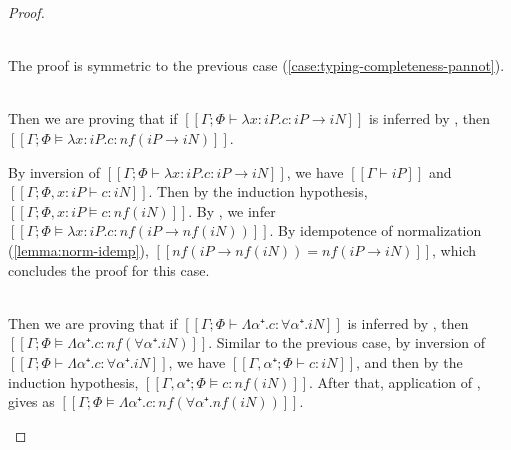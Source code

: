 \begin{proof}
\begin{caseof}
        \item {}\\
            The proof is symmetric to the previous case 
            (\cref{case:typing-completeness-pannot}).

        \item {}\\
            Then we are proving that if
            $[[Γ ; Φ ⊢ λx:iP . c : iP → iN]]$ is inferred by ,
            then $[[Γ ; Φ ⊨ λx:iP . c : nf(iP → iN)]]$.

            By inversion of $[[Γ ; Φ ⊢ λx:iP . c : iP → iN]]$, we have
            $[[Γ ⊢ iP]]$ and $[[Γ; Φ, x:iP ⊢ c : iN]]$.
            Then by the induction hypothesis, $[[Γ; Φ, x:iP ⊨ c : nf(iN)]]$.
            By , we infer
            $[[Γ; Φ ⊨ λx:iP . c : nf(iP → nf(iN))]]$. 
            By idempotence of normalization (\cref{lemma:norm-idemp}), 
            $[[nf(iP → nf(iN)) = nf(iP → iN)]]$, 
            which concludes the proof for this case.

        \item {}\\
            Then we are proving that if
            $[[Γ ; Φ ⊢ Λα⁺ . c : ∀α⁺.iN]]$ is inferred by ,
            then $[[Γ ; Φ ⊨ Λα⁺ . c : nf(∀α⁺.iN)]]$.
            Similar to the previous case, 
            by inversion of $[[Γ ; Φ ⊢ Λα⁺ . c : ∀α⁺.iN]]$, we have
            $[[Γ, α⁺ ; Φ ⊢ c : iN]]$, and then by the induction hypothesis,
            $[[Γ, α⁺ ; Φ ⊨ c : nf(iN)]]$.
            After that, application of , 
            gives as $[[Γ ; Φ ⊨ Λα⁺ . c : nf(∀α⁺.nf(iN))]]$.


\end{caseof}
\end{proof}
